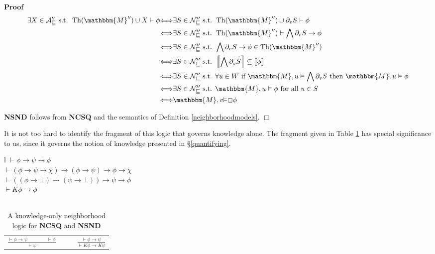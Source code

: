 \documentclass{article}
\newcommand{\tmop}[1]{\ensuremath{\operatorname{#1}}}
\newcommand{\tmstrong}[1]{\textbf{#1}}
\newcommand{\tmtextbf}[1]{{\bfseries{#1}}}
\newenvironment{proof}{\noindent\textbf{Proof\ }}{\hspace*{\fill}$\Box$\medskip}
\begin{document}
\begin{proof}
  \begin{align*}
    \text{$\exists X \in \mathcal{A''_v} \text{ s.t. } \tmop{Th}
    (\mathbbm{M}'') \cup X \vdash \phi$} & {\Longleftrightarrow}\text{$\exists
    S \in \mathcal{N''_v} \text{ s.t. } \tmop{Th} (\mathbbm{M}'') \cup
    \partial_v S \vdash \phi$}\\
    & {\Longleftrightarrow}\text{$\exists S \in \mathcal{N''_v} \text{ s.t. }
    \tmop{Th} (\mathbbm{M}'') \vdash \bigwedge \partial_v S \rightarrow
    \phi$}\\
    & {\Longleftrightarrow}\text{$\exists S \in \mathcal{N''_v} \text{ s.t. }
    \bigwedge \partial_v S \rightarrow \phi \in \tmop{Th} (\mathbbm{M}'')$}\\
    & {\Longleftrightarrow}\text{$\exists S \in \mathcal{N''_v} \text{ s.t. }
    \left\llbracket \bigwedge \partial_v S \right\rrbracket \subseteq
    \left\llbracket \phi \right\rrbracket$}\\
    & {\Longleftrightarrow}\text{$\exists S \in \mathcal{N''_v} \text{ s.t.
    $\forall u \in W$ if } \mathbbm{M}, u \vDash \bigwedge \partial_v S \text{
    then } \mathbbm{M}, u \vDash \phi$}\\
    & {\Longleftrightarrow}\text{$\exists S \in \mathcal{N''_v} \text{ s.t. }
    \mathbbm{M}, u \vDash \phi \text{ for all } u \in S$}\\
    & {\Longleftrightarrow}{\mathbbm{M}},v{\vDash}\Box{\phi}
  \end{align*}
  
  \tmtextbf{NSND} follows from \tmtextbf{NCSQ} and the semantics of Definition
  \ref{neighborhoodmodels}.
\end{proof}

It is not too hard to identify the fragment of this logic that governs
knowledge alone.  The fragment given in Table \ref{logic4} has special
significance to us, since it governs the notion of knowledge presented in
{\S}\ref{quantifying}.

\begin{table}[h]
  \begin{tabular}{l}
    $\vdash \phi \rightarrow \psi \rightarrow \phi$\\
    $\vdash (\phi \rightarrow \psi \rightarrow \chi) \rightarrow (\phi
    \rightarrow \psi) \rightarrow \phi \rightarrow \chi$\\
    $\vdash ((\phi \rightarrow \bot) \rightarrow (\psi \rightarrow \bot))
    \rightarrow \psi \rightarrow \phi$\\
    $\vdash K \phi \rightarrow \phi$\\
    \\
    \begin{tabular}{llll}
      $\frac{\vdash \phi \rightarrow \psi \hspace{4em} \vdash \phi}{\vdash
      \psi}$ &  &  & $\frac{\vdash \phi \rightarrow \psi}{\vdash K \phi
      \rightarrow K \psi}$
    \end{tabular}
  \end{tabular}
  \caption{\label{logic4}A knowledge-only neighborhood logic for
  \tmtextbf{NCSQ} and {\tmstrong{NSND}}}
\end{table}
\end{document}
